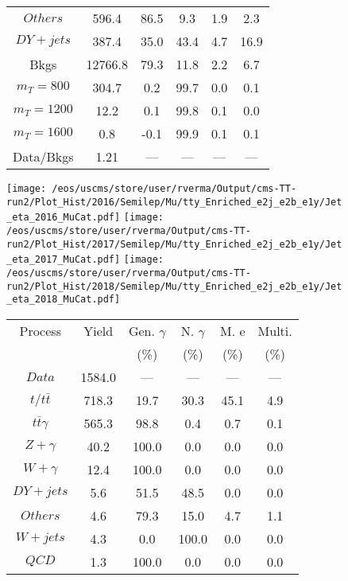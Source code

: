 \begin{figure}
\begin{minipage}[c]{0.32\textwidth}
{\begin{tabular}{cccccc}
$ Others $ &  596.4 &  86.5 &  9.3 &  1.9 &  2.3\\
$ DY+jets $ &  387.4 &  35.0 &  43.4 &  4.7 &  16.9\\
Bkgs &  12766.8 &  79.3 &  11.8 &  2.2 &  6.7\\
$ m_{T} = 800 $ &  304.7 &  0.2 &  99.7 &  0.0 &  0.1\\
$ m_{T} = 1200 $ &  12.2 &  0.1 &  99.8 &  0.1 &  0.0\\
$ m_{T} = 1600 $ &  0.8 &  -0.1 &  99.9 &  0.1 &  0.1\\
Data/Bkgs &  1.21 &  --- &  --- &  --- &  ---\\
\hline
\end{tabular}
}
\end{minipage}
\end{figure}

\begin{figure}
\centering
\texttt{[image: /eos/uscms/store/user/rverma/Output/cms-TT-run2/Plot\_Hist/2016/Semilep/Mu/tty\_Enriched\_e2j\_e2b\_e1y/Jet\_eta\_2016\_MuCat.pdf]}
\texttt{[image: /eos/uscms/store/user/rverma/Output/cms-TT-run2/Plot\_Hist/2017/Semilep/Mu/tty\_Enriched\_e2j\_e2b\_e1y/Jet\_eta\_2017\_MuCat.pdf]}
\texttt{[image: /eos/uscms/store/user/rverma/Output/cms-TT-run2/Plot\_Hist/2018/Semilep/Mu/tty\_Enriched\_e2j\_e2b\_e1y/Jet\_eta\_2018\_MuCat.pdf]}
\begin{minipage}[c]{0.32\textwidth}
\centering
\tiny{
\begin{tabular}{cccccc}
\hline
Process & Yield & Gen. $\gamma$ & N. $\gamma$ & M. e & Multi. \\
 &  & (\%) & (\%) & (\%) & (\%)  \\
\hline
                                                                      $ Data $ &  1584.0 &  --- &  --- &  --- &  ---\\
$ t/t\bar{t} $ &  718.3 &  19.7 &  30.3 &  45.1 &  4.9\\
$ t\bar{t}\gamma $ &  565.3 &  98.8 &  0.4 &  0.7 &  0.1\\
$ Z+\gamma $ &  40.2 &  100.0 &  0.0 &  0.0 &  0.0\\
$ W+\gamma $ &  12.4 &  100.0 &  0.0 &  0.0 &  0.0\\
$ DY+jets $ &  5.6 &  51.5 &  48.5 &  0.0 &  0.0\\
$ Others $ &  4.6 &  79.3 &  15.0 &  4.7 &  1.1\\
$ W+jets $ &  4.3 &  0.0 &  100.0 &  0.0 &  0.0\\
$ QCD $ &  1.3 &  100.0 &  0.0 &  0.0 &  0.0\\

\end{tabular}}
\end{minipage}
\end{figure}

